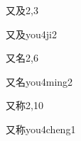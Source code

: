 \begin{entry}{又及}{2,3}
  \begin{phonetics}{又及}{you4ji2}
  \end{phonetics}
\end{entry}

\begin{entry}{又名}{2,6}
  \begin{phonetics}{又名}{you4ming2}
  \end{phonetics}
\end{entry}

\begin{entry}{又称}{2,10}
  \begin{phonetics}{又称}{you4cheng1}
  \end{phonetics}
\end{entry}


